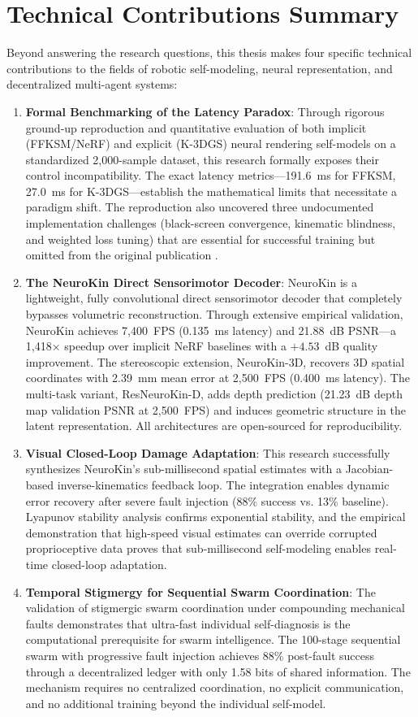 \documentclass[12pt,a4paper,oneside]{report}
\begin{document}
\section{Technical Contributions Summary}
Beyond answering the research questions, this thesis makes four specific technical contributions to the fields of robotic self-modeling, neural representation, and decentralized multi-agent systems:
\begin{enumerate}
    \item \textbf{Formal Benchmarking of the Latency Paradox}: Through rigorous ground-up reproduction and quantitative evaluation of both implicit (FFKSM/NeRF) and explicit (K-3DGS) neural rendering self-models on a standardized 2,000-sample dataset, this research formally exposes their control incompatibility. The exact latency metrics---191.6~ms for FFKSM, 27.0~ms for K-3DGS---establish the mathematical limits that necessitate a paradigm shift. The reproduction also uncovered three undocumented implementation challenges (black-screen convergence, kinematic blindness, and weighted loss tuning) that are essential for successful training but omitted from the original publication \cite{hu2024teaching}.
    \item \textbf{The NeuroKin Direct Sensorimotor Decoder}: NeuroKin is a lightweight, fully convolutional direct sensorimotor decoder that completely bypasses volumetric reconstruction. Through extensive empirical validation, NeuroKin achieves 7,400~FPS (0.135~ms latency) and 21.88~dB PSNR---a 1,418$\times$ speedup over implicit NeRF baselines with a $+4.53$~dB quality improvement. The stereoscopic extension, NeuroKin-3D, recovers 3D spatial coordinates with 2.39~mm mean error at 2,500~FPS (0.400~ms latency). The multi-task variant, ResNeuroKin-D, adds depth prediction (21.23~dB depth map validation PSNR at 2,500~FPS) and induces geometric structure in the latent representation. All architectures are open-sourced for reproducibility.
    \item \textbf{Visual Closed-Loop Damage Adaptation}: This research successfully synthesizes NeuroKin's sub-millisecond spatial estimates with a Jacobian-based inverse-kinematics feedback loop. The integration enables dynamic error recovery after severe fault injection (88\% success vs. 13\% baseline). Lyapunov stability analysis confirms exponential stability, and the empirical demonstration that high-speed visual estimates can override corrupted proprioceptive data proves that sub-millisecond self-modeling enables real-time closed-loop adaptation.
    \item \textbf{Temporal Stigmergy for Sequential Swarm Coordination}: The validation of stigmergic swarm coordination under compounding mechanical faults demonstrates that ultra-fast individual self-diagnosis is the computational prerequisite for swarm intelligence. The 100-stage sequential swarm with progressive fault injection achieves 88\% post-fault success through a decentralized ledger with only 1.58 bits of shared information. The mechanism requires no centralized coordination, no explicit communication, and no additional training beyond the individual self-model.
\end{enumerate}
\end{document}
